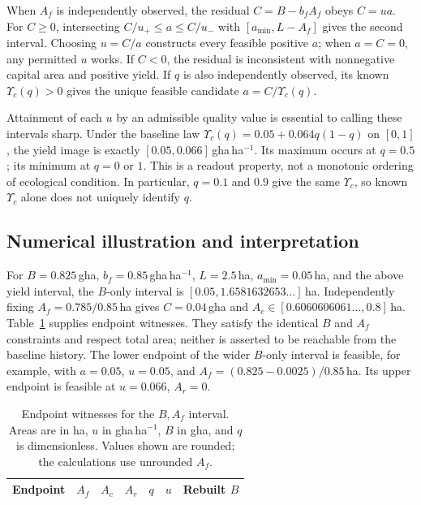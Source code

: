 \documentclass[11pt,a4paper]{article}
\newcommand{\Ups}{\Upsilon_c}
\begin{document}
When $A_f$ is independently observed, the residual $C=B-b_fA_f$ obeys $C=ua$. For $C\ge0$, intersecting $C/u_+\le a\le C/u_-$ with $[a_{\min},L-A_f]$ gives the second interval. Choosing $u=C/a$ constructs every feasible positive $a$; when $a=C=0$, any permitted $u$ works. If $C<0$, the residual is inconsistent with nonnegative capital area and positive yield. If $q$ is also independently observed, its known $\Ups(q)>0$ gives the unique feasible candidate $a=C/\Ups(q)$.

Attainment of each $u$ by an admissible quality value is essential to calling these intervals sharp. Under the baseline law $\Ups(q)=0.05+0.064q(1-q)$ on $[0,1]$, the yield image is exactly $[0.05,0.066]$\,gha\,ha$^{-1}$. Its maximum occurs at $q=0.5$; its minimum at $q=0$ or $1$. This is a readout property, not a monotonic ordering of ecological condition. In particular, $q=0.1$ and $0.9$ give the same $\Ups$, so known $\Ups$ alone does not uniquely identify $q$.

\subsection{Numerical illustration and interpretation}

For $B=0.825$\,gha, $b_f=0.85$\,gha\,ha$^{-1}$, $L=2.5$\,ha, $a_{\min}=0.05$\,ha, and the above yield interval, the $B$-only interval is $[0.05,1.6581632653\ldots]$\,ha. Independently fixing $A_f=0.785/0.85$\,ha gives $C=0.04$\,gha and $A_c\in[0.6060606061\ldots,0.8]$\,ha. Table~\ref{tab:si_c13witness} supplies endpoint witnesses. They satisfy the identical $B$ and $A_f$ constraints and respect total area; neither is asserted to be reachable from the baseline history. The lower endpoint of the wider $B$-only interval is feasible, for example, with $a=0.05$, $u=0.05$, and $A_f=(0.825-0.0025)/0.85$\,ha. Its upper endpoint is feasible at $u=0.066$, $A_r=0$.

\begin{table}[htbp]
\centering\small
\caption{Endpoint witnesses for the $B,A_f$ interval. Areas are in ha, $u$ in gha\,ha$^{-1}$, $B$ in gha, and $q$ is dimensionless. Values shown are rounded; the calculations use unrounded $A_f$.}
\label{tab:si_c13witness}
\begin{tabular}{lrrrrrr}
\toprule
Endpoint & $A_f$ & $A_c$ & $A_r$ & $q$ & $u$ & Rebuilt $B$ \\
\midrule

\end{tabular}
\end{table}
\end{document}
